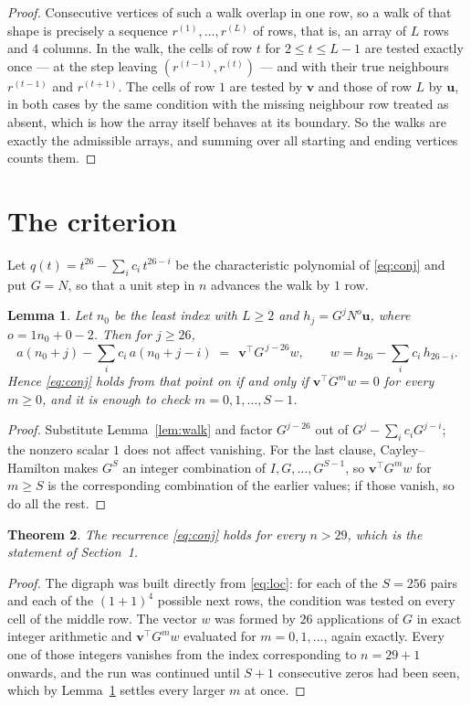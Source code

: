 \documentclass[11pt,a4paper]{article}
\theoremstyle{plain}
\newtheorem{theorem}{Theorem}
\newtheorem{lemma}[theorem]{Lemma}
\theoremstyle{definition}
\begin{document}
\begin{proof}
Consecutive vertices of such a walk overlap in one row, so a walk of that shape is
precisely a sequence $r^{(1)},\dots,r^{(L)}$ of rows, that is, an array of $L$ rows
and $4$ columns. In the walk, the cells of row $t$ for $2\le t\le L-1$ are tested
exactly once --- at the step leaving $(r^{(t-1)},r^{(t)})$ --- and with their true
neighbours $r^{(t-1)}$ and $r^{(t+1)}$. The cells of row $1$ are tested by
$\mathbf{v}$ and those of row $L$ by $\mathbf{u}$, in both cases by the same condition
with the missing neighbour row treated as absent, which is how the array itself behaves at
its boundary. So the walks are exactly the admissible arrays, and summing over all starting
and ending vertices counts them.
\end{proof}

\section{The criterion}

Let $q(t)=t^{26}-\sum_i c_i\,t^{26-i}$ be the characteristic polynomial of
\eqref{eq:conj} and put $G=N$, so that a unit step in $n$ advances the walk by
$1$ row.

\begin{lemma}\label{lem:crit}
Let $n_0$ be the least index with $L\ge2$ and $h_j=G^{j}N^{o}\mathbf{u}$, where
$o=1n_0+0-2$. Then for $j\ge26$,
\[
a(n_0+j)-\sum_i c_i\,a(n_0+j-i)\;=\;\,\mathbf{v}^{\!\top}G^{\,j-26}w,
\qquad w=h_{26}-\sum_i c_i\,h_{26-i} .
\]
Hence \eqref{eq:conj} holds from that point on if and only if
$\mathbf{v}^{\!\top}G^{m}w=0$ for every $m\ge0$, and it is enough to check
$m=0,1,\dots,S-1$.
\end{lemma}

\begin{proof}
Substitute Lemma~\ref{lem:walk} and factor $G^{j-26}$ out of
$G^{j}-\sum_ic_iG^{j-i}$; the nonzero scalar $1$ does not affect
vanishing. For the last clause, Cayley--Hamilton makes $G^{S}$ an integer combination of
$I,G,\dots,G^{S-1}$, so $\mathbf{v}^{\!\top}G^{m}w$ for $m\ge S$ is the corresponding
combination of the earlier values; if those vanish, so do all the rest.
\end{proof}

\begin{theorem}
The recurrence \eqref{eq:conj} holds for every $n>29$, which is the statement of
Section~1.
\end{theorem}

\begin{proof}
The digraph was built directly from \eqref{eq:loc}: for each of the $S=256$ pairs and each
of the $(1+1)^{4}$ possible next rows, the condition was tested on every cell of
the middle row. The vector $w$ was formed by $26$ applications of $G$ in exact integer
arithmetic and $\mathbf{v}^{\!\top}G^{m}w$ evaluated for $m=0,1,\dots$, again exactly.
Every one of those integers vanishes from the index corresponding to $n=29+1$ onwards,
and the run was continued until $S+1$ consecutive zeros had been seen, which by
Lemma~\ref{lem:crit} settles every larger $m$ at once.
\end{proof}
\end{document}
